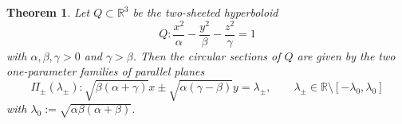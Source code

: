 \documentclass[10pt, a4paper]{article}
\theoremstyle{BoldTopSpacing}
\newtheorem{theorem}{Theorem}[section]
\theoremstyle{BoldTopSpacing}
\theoremstyle{BoldTopSpacing}
\theoremstyle{BoldTopBottomSpacing}
\theoremstyle{BoldTopSpacing}
\theoremstyle{BoldTopBottomSpacing}
\theoremstyle{remark}
\begin{document}
\begin{theorem}
\label{thm:circular-sections-hyperboloid}
Let $Q \subset \mathbb{R}^3$ be the two-sheeted hyperboloid
\begin{equation}
\label{eq:two-sheeted-alpha-beta-gamma}
Q : \frac{x^2}{\alpha} - \frac{y^2}{\beta} - \frac{z^2}{\gamma} = 1
\end{equation}
with $\alpha, \beta, \gamma > 0$ and $\gamma > \beta$. Then the circular sections of $Q$ are given by the two one-parameter families of parallel planes
\begin{equation}
\label{eq:planes-two-sheeted}
\Pi_{\pm}(\lambda_{\pm}) :\sqrt{\beta (\alpha + \gamma)} x \pm \sqrt{\alpha (\gamma - \beta)} y = \lambda_{\pm}, \quad \quad \lambda_{\pm} \in \mathbb{R} \setminus \left[-\lambda_{0}, \lambda_{0} \right]
\end{equation}
with $\lambda_{0} := \sqrt{\alpha \beta (\alpha+\beta)}$.
\end{theorem}
\end{document}
